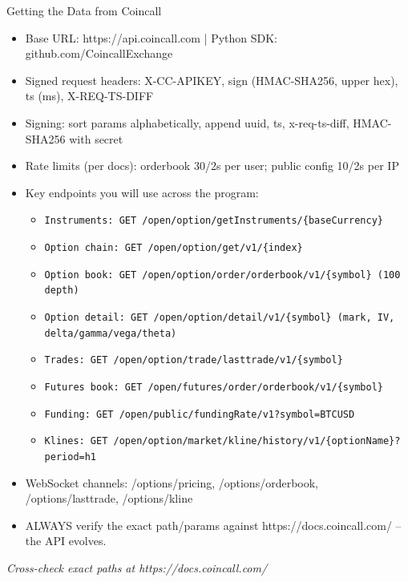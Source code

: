 \documentclass[aspectratio=169,10pt]{beamer}
\begin{document}
\begin{frame}{Getting the Data from Coincall}
\begin{itemize}
  \item Base URL: https://api.coincall.com   |   Python SDK: github.com/CoincallExchange
  \item Signed request headers: X-CC-APIKEY, sign (HMAC-SHA256, upper hex), ts (ms), X-REQ-TS-DIFF
  \item Signing: sort params alphabetically, append uuid, ts, x-req-ts-diff, HMAC-SHA256 with secret
  \item Rate limits (per docs): orderbook 30/2s per user; public config 10/2s per IP
  \item Key endpoints you will use across the program:
  \begin{itemize}\item \texttt{\small Instruments:   GET /open/option/getInstruments/\{baseCurrency\}}\end{itemize}
  \begin{itemize}\item \texttt{\small Option chain:  GET /open/option/get/v1/\{index\}}\end{itemize}
  \begin{itemize}\item \texttt{\small Option book:   GET /open/option/order/orderbook/v1/\{symbol\}  (100 depth)}\end{itemize}
  \begin{itemize}\item \texttt{\small Option detail: GET /open/option/detail/v1/\{symbol\}  (mark, IV, delta/gamma/vega/theta)}\end{itemize}
  \begin{itemize}\item \texttt{\small Trades:        GET /open/option/trade/lasttrade/v1/\{symbol\}}\end{itemize}
  \begin{itemize}\item \texttt{\small Futures book:  GET /open/futures/order/orderbook/v1/\{symbol\}}\end{itemize}
  \begin{itemize}\item \texttt{\small Funding:       GET /open/public/fundingRate/v1?symbol=BTCUSD}\end{itemize}
  \begin{itemize}\item \texttt{\small Klines:        GET /open/option/market/kline/history/v1/\{optionName\}?period=h1}\end{itemize}
  \item WebSocket channels: /options/pricing, /options/orderbook, /options/lasttrade, /options/kline
  \item ALWAYS verify the exact path/params against https://docs.coincall.com/ -- the API evolves.
\end{itemize}
\vspace{2pt}\tiny\textit{Cross-check exact paths at https://docs.coincall.com/}
\end{frame}
\end{document}
